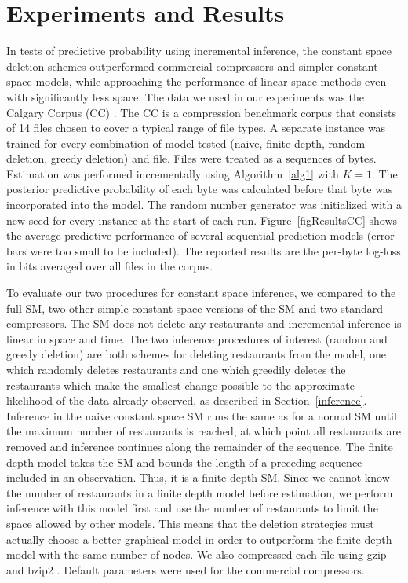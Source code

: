 \section{Experiments and Results}
\label{results}

In tests of predictive probability using incremental inference, the constant space deletion schemes outperformed commercial compressors and simpler constant space models, while approaching the performance of linear space methods even with significantly less space.  The data we used in our experiments was the Calgary Corpus (CC) \cite{Bell1989}.  The CC is a compression benchmark corpus that consists of 14 files chosen to cover a typical range of file types.  A separate instance was trained for every combination of model tested (naive, finite depth, random deletion, greedy deletion) and file.  Files were treated as a sequences of bytes.  Estimation was performed incrementally using Algorithm~\ref{alg1} with $K=1$. The posterior predictive probability of each byte was calculated before that byte was incorporated into the model.  The random number generator was initialized with a new seed for every instance at the start of each run.  Figure~\ref{figResultsCC} shows the average predictive performance of several sequential prediction models (error bars were too small to be included).  The reported results are the per-byte log-loss in bits averaged over all files in the corpus.  


To evaluate our two procedures for constant space inference, we compared to the full SM, two other simple constant space versions of the SM and two standard compressors.  The SM does not delete any restaurants and incremental inference is linear in space and time.  The two inference procedures of interest (random and greedy deletion) are both schemes for deleting restaurants from the model, one which randomly deletes restaurants and one which greedily deletes the restaurants which make the smallest change possible to the approximate likelihood of the data already observed, as described in Section~\ref{inference}.  Inference in the naive constant space SM runs the same as for a normal SM until the maximum number of restaurants is reached, at which point all restaurants are removed and inference continues along the remainder of the sequence.  The finite depth model takes the SM and bounds the length of a preceding sequence included in an observation.  Thus, it is a finite depth SM. Since we cannot know the number of restaurants in a finite depth model before estimation, we perform inference with this model first and use the number of restaurants to limit the space allowed by other models. This means that the deletion strategies must actually choose a better graphical model in order to outperform the finite depth model with the same number of nodes. We also compressed each file using gzip and bzip2 \cite{Deutsch1996, Seward1999}.  Default parameters were used for the commercial compressors.

